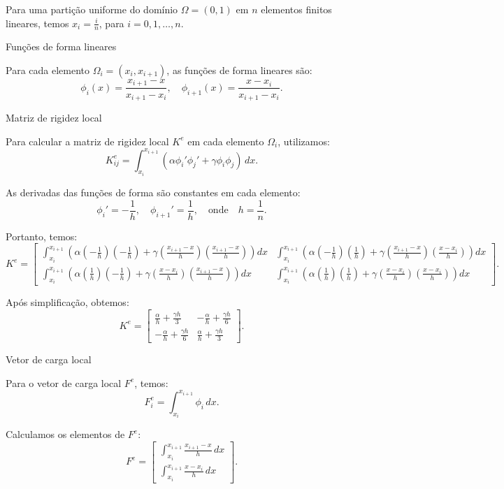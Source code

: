 \documentclass{article}
\begin{document}
Para uma partição uniforme do domínio \(\Omega = (0, 1)\) em \(n\) elementos finitos lineares, temos \(x_i = \frac{i}{n}\), para \(i = 0, 1, \ldots, n\).

 Funções de forma lineares

Para cada elemento \(\Omega_i = (x_i, x_{i+1})\), as funções de forma lineares são:
\[
\phi_i(x) = \frac{x_{i+1} - x}{x_{i+1} - x_i}, \quad \phi_{i+1}(x) = \frac{x - x_i}{x_{i+1} - x_i}.
\]

 Matriz de rigidez local

Para calcular a matriz de rigidez local \(K^e\) em cada elemento \(\Omega_i\), utilizamos:
\[
K^e_{ij} = \int_{x_i}^{x_{i+1}} (\alpha \phi_i' \phi_j' + \gamma \phi_i \phi_j) \, dx.
\]

As derivadas das funções de forma são constantes em cada elemento:
\[
\phi_i' = -\frac{1}{h}, \quad \phi_{i+1}' = \frac{1}{h}, \quad \text{onde} \quad h = \frac{1}{n}.
\]

Portanto, temos:
\[
K^e = \begin{bmatrix}
\int_{x_i}^{x_{i+1}} \left( \alpha \left( -\frac{1}{h} \right) \left( -\frac{1}{h} \right) + \gamma \left( \frac{x_{i+1} - x}{h} \right) \left( \frac{x_{i+1} - x}{h} \right) \right) dx & \int_{x_i}^{x_{i+1}} \left( \alpha \left( -\frac{1}{h} \right) \left( \frac{1}{h} \right) + \gamma \left( \frac{x_{i+1} - x}{h} \right) \left( \frac{x - x_i}{h} \right) \right) dx \\
\int_{x_i}^{x_{i+1}} \left( \alpha \left( \frac{1}{h} \right) \left( -\frac{1}{h} \right) + \gamma \left( \frac{x - x_i}{h} \right) \left( \frac{x_{i+1} - x}{h} \right) \right) dx & \int_{x_i}^{x_{i+1}} \left( \alpha \left( \frac{1}{h} \right) \left( \frac{1}{h} \right) + \gamma \left( \frac{x - x_i}{h} \right) \left( \frac{x - x_i}{h} \right) \right) dx
\end{bmatrix}.
\]

Após simplificação, obtemos:
\[
K^e = \begin{bmatrix}
\frac{\alpha}{h} + \frac{\gamma h}{3} & -\frac{\alpha}{h} + \frac{\gamma h}{6} \\
-\frac{\alpha}{h} + \frac{\gamma h}{6} & \frac{\alpha}{h} + \frac{\gamma h}{3}
\end{bmatrix}.
\]

 Vetor de carga local

Para o vetor de carga local \(F^e\), temos:
\[
F^e_i = \int_{x_i}^{x_{i+1}} \phi_i \, dx.
\]

Calculamos os elementos de \(F^e\):
\[
F^e = \begin{bmatrix}
\int_{x_i}^{x_{i+1}} \frac{x_{i+1} - x}{h} \, dx \\
\int_{x_i}^{x_{i+1}} \frac{x - x_i}{h} \, dx
\end{bmatrix}.
\]
\end{document}

